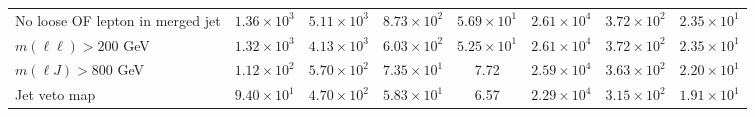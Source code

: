 \begin{table}[htp]
{\begin{tabular}{l | c c c c | c c c}
      No loose OF lepton in merged jet & $1.36 \times 10^{3}$ & $5.11 \times 10^{3}$ & $8.73 \times 10^{2}$ & $5.69 \times 10^{1}$ & $2.61 \times 10^{4}$ & $3.72 \times 10^{2}$ & $2.35 \times 10^{1}$ \\
      $m(\ell\ell) > 200$ GeV & $1.32 \times 10^{3}$ & $4.13 \times 10^{3}$ & $6.03 \times 10^{2}$ & $5.25 \times 10^{1}$ & $2.61 \times 10^{4}$ & $3.72 \times 10^{2}$ & $2.35 \times 10^{1}$ \\
      $m(\ell J) > 800$ GeV & $1.12 \times 10^{2}$ & $5.70 \times 10^{2}$ & $7.35 \times 10^{1}$ & 7.72 & $2.59 \times 10^{4}$ & $3.63 \times 10^{2}$ & $2.20 \times 10^{1}$ \\
      Jet veto map & $9.40 \times 10^{1}$ & $4.70 \times 10^{2}$ & $5.83 \times 10^{1}$ & 6.57 & $2.29 \times 10^{4}$ & $3.15 \times 10^{2}$ & $1.91 \times 10^{1}$ \\
      \hline
    \end{tabular}
  }
\end{table}
